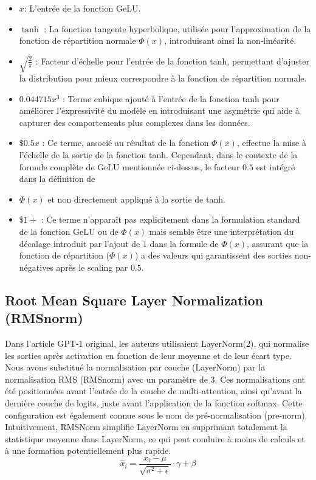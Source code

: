 \documentclass{rapport}
\begin{document}
            \begin{itemize}
                \item $x$: L'entrée de la fonction GeLU.
                \item $\tanh$ : La fonction tangente hyperbolique, utilisée pour l'approximation de la fonction de répartition normale $\Phi(x)$, introduisant ainsi la non-linéarité.
                \item $\sqrt{\frac{2}{\pi}}$ : Facteur d'échelle pour l'entrée de la fonction tanh, permettant d'ajuster la distribution pour mieux correspondre à la fonction de répartition normale.
                \item $0.044715x^3$ : Terme cubique ajouté à l'entrée de la fonction tanh pour améliorer l'expressivité du modèle en introduisant une asymétrie qui aide à capturer des comportements plus complexes dans les données.
                \item $\$0.5x$ : Ce terme, associé au résultat de la fonction $\Phi(x)$, effectue la mise à l'échelle de la sortie de la fonction tanh. Cependant, dans le contexte de la formule complète de GeLU mentionnée ci-dessus, le facteur $0.5$ est intégré dans la définition de 
                \item $\Phi(x)$ et non directement appliqué à la sortie de tanh.
                \item $\$1+$ : Ce terme n'apparaît pas explicitement dans la formulation standard de la fonction GeLU ou de $\Phi(x)$ mais semble être une interprétation du décalage introduit par l'ajout de $1$ dans la formule de $\Phi(x)$, assurant que la fonction de répartition ($\Phi(x)$) a des valeurs qui garantissent des sorties non-négatives après le scaling par $0.5$.
            \end{itemize}
            
        \subsection{Root Mean Square Layer Normalization (RMSnorm)}
        
            Dans l'article GPT-1 original, les auteurs utilisaient LayerNorm(2), qui normalise les sorties après activation en fonction de leur moyenne et de leur écart type. Nous avons substitué la normalisation par couche (LayerNorm) par la normalisation RMS (RMSnorm) avec un paramètre de 3. Ces normalisations ont été positionnées avant l'entrée de la couche de multi-attention, ainsi qu'avant la dernière couche de logits, juste avant l'application de la fonction softmax. Cette configuration est également connue sous le nom de pré-normalisation (pre-norm). Intuitivement, RMSNorm simplifie LayerNorm en supprimant totalement la statistique moyenne dans LayerNorm, ce qui peut conduire à moins de calculs et à une formation potentiellement plus rapide.
                    \begin{equation}
            \hat{x}_{i} = \frac{x_i - \mu}{\sqrt{\sigma^2 + \epsilon}} \cdot \gamma + \beta
            \end{equation}
            
\end{document}
